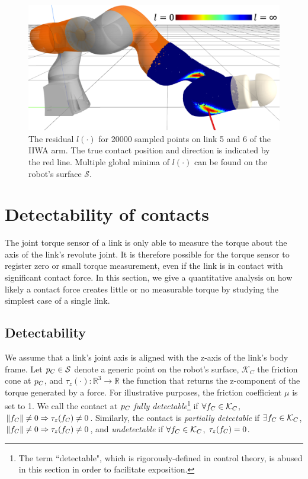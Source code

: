 \begin{figure}[h]
\centering
\includegraphics[width=0.85\linewidth]{figures/05_force_from_torque/multiple_local_minima.png}
\caption{The residual $l(\cdot)$ for 20000 sampled points on link 5 and 6 of the IIWA arm. The true contact position and direction is indicated by the red line. Multiple global minima of $l(\cdot)$ can be found on the robot's surface $\mathcal{S}$.}
\label{fig:multiple_local_minima}
\end{figure}

\section{Detectability of contacts \label{sec:observability}}
The joint torque sensor of a link is only able to measure the torque about the axis of the link's revolute joint. It is therefore possible for the torque sensor to register zero or small torque measurement, even if the link is in contact with significant contact force. In this section, we give a quantitative analysis on how likely a contact force creates little or no measurable torque by studying the simplest case of a single link.

\subsection{Detectability}
We assume that a link's joint axis is aligned with the z-axis of the link's body frame. Let ${p}_C \in \mathcal{S}$ denote a generic point on the robot's surface, $\mathcal{K}_C$ the friction cone at ${p}_C$, and $\tau_z(\cdot): \mathbb{R}^3 \rightarrow \mathbb{R}$ the function that returns the z-component of the torque generated by a force. For illustrative purposes, the friction coefficient $\mu$ is set to 1. We call the contact at ${p}_C$ \textit{fully detectable}\footnote{The term ``detectable", which is rigorously-defined in control theory, is abused in this section in order to facilitate exposition.} if $\forall {f}_C \in \mathcal{K}_C$, $\left\lVert{{f}_C}\right\rVert \neq 0 \Rightarrow \tau_z({f}_C) \neq 0$. Similarly, the contact is \textit{partially detectable} if $\exists {f}_C \in \mathcal{K}_C$,  $\left\lVert{{f}_C}\right\rVert \neq 0 \Rightarrow \tau_z({f}_C) \neq 0$, and \textit{undetectable} if $\forall {f}_C \in \mathcal{K}_C$, $\tau_z({f}_C) = 0$.

